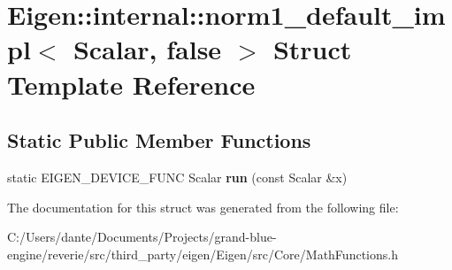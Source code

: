 \hypertarget{struct_eigen_1_1internal_1_1norm1__default__impl_3_01_scalar_00_01false_01_4}{}\section{Eigen\+::internal\+::norm1\+\_\+default\+\_\+impl$<$ Scalar, false $>$ Struct Template Reference}
\label{struct_eigen_1_1internal_1_1norm1__default__impl_3_01_scalar_00_01false_01_4}
\subsection*{Static Public Member Functions}
\begin{DoxyCompactItemize}
\item 
\mbox{\label{struct_eigen_1_1internal_1_1norm1__default__impl_3_01_scalar_00_01false_01_4_a0d6af7b8892406d66ea0810c46e29eae}} 
static E\+I\+G\+E\+N\+\_\+\+D\+E\+V\+I\+C\+E\+\_\+\+F\+U\+NC Scalar {\bfseries run} (const Scalar \&x)
\end{DoxyCompactItemize}


The documentation for this struct was generated from the following file\+:\begin{DoxyCompactItemize}
\item 
C\+:/\+Users/dante/\+Documents/\+Projects/grand-\/blue-\/engine/reverie/src/third\+\_\+party/eigen/\+Eigen/src/\+Core/Math\+Functions.\+h\end{DoxyCompactItemize}
